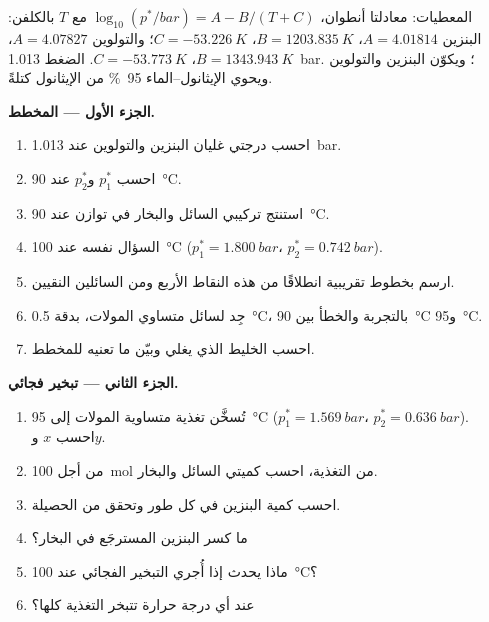 \begin{problem}
\label{pb:b2:liquid-vapour-diagrams:1}
المعطيات: معادلتا أنطوان، $\log_{10}(p^*/\unit{bar}) = A - B/(T + C)$ مع $T$
بالكلفن: البنزين $A = 4.01814$، $B = \qty{1203.835}{K}$، $C =
\qty{-53.226}{K}$؛ والتولوين $A = 4.07827$، $B = \qty{1343.943}{K}$، $C =
\qty{-53.773}{K}$. الضغط \qty{1.013}{bar}؛ ويكوّن البنزين والتولوين . ويحوي  الإيثانول--الماء 95~\% من الإيثانول كتلةً.

\medskip
\noindent\textbf{الجزء الأول --- المخطط.}
\begin{enumerate}
  \item احسب درجتي غليان البنزين والتولوين عند \qty{1.013}{bar}.
  \item احسب $p_1^*$ و$p_2^*$ عند \qty{90}{\degreeCelsius}.
  \item استنتج تركيبي السائل والبخار في توازن
        عند \qty{90}{\degreeCelsius}.
  \item السؤال نفسه عند \qty{100}{\degreeCelsius} ($p_1^* = \qty{1.800}{bar}$، $p_2^* =
        \qty{0.742}{bar}$).
  \item ارسم بخطوط تقريبية  انطلاقًا من هذه النقاط الأربع ومن السائلين النقيين.
  \item جِد  لسائل متساوي المولات، بدقة
        \qty{0.5}{\degreeCelsius}، بالتجربة والخطأ بين \qty{90}{\degreeCelsius} 
        و\qty{95}{\degreeCelsius}.
  \item احسب  الخليط الذي يغلي وبيّن ما تعنيه
        للمخطط.
\end{enumerate}

\medskip
\noindent\textbf{الجزء الثاني --- تبخير فجائي.}
\begin{enumerate}[resume]
  \item تُسخَّن تغذية متساوية المولات إلى \qty{95}{\degreeCelsius} ($p_1^* =
        \qty{1.569}{bar}$، $p_2^* = \qty{0.636}{bar}$). احسب $x$ و$y$.
  \item من أجل \qty{100}{mol} من التغذية، احسب كميتي السائل والبخار.
  \item احسب كمية البنزين في كل طور وتحقق من الحصيلة.
  \item ما كسر البنزين المسترجَع في البخار؟
  \item ماذا يحدث إذا أُجري التبخير الفجائي عند \qty{100}{\degreeCelsius}؟
  \item عند أي درجة حرارة تتبخر التغذية كلها؟
\end{enumerate}


\end{problem}
